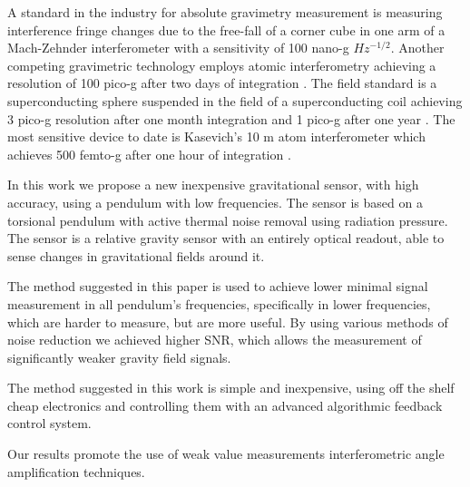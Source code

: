 \documentclass[\main/master.tex]{subfiles}
\begin{document}
\fi
\par\noindent
A standard in the industry for absolute gravimetry measurement is measuring interference fringe changes due to the free-fall of a corner cube in one arm of a Mach-Zehnder interferometer with a sensitivity of 100 nano-g $Hz^{-1/2}$. Another competing gravimetric technology employs atomic interferometry achieving a resolution of 100 pico-g after two days of integration \cite{Peters01}.
The field standard is a superconducting sphere suspended in the field of a superconducting coil achieving 3 pico-g resolution after one month integration and 1 pico-g  after one year \cite{Goodkind99}. 
The most sensitive device to date is Kasevich's 10 m atom interferometer which achieves 500 femto-g after one hour of integration \cite{PhysRevA.91.033629,kasevich2014prospects}. 
\par\noindent
In this work we propose a new inexpensive gravitational sensor, with high accuracy, using a pendulum with low frequencies. The sensor is based on a torsional pendulum with active thermal noise removal using radiation pressure. The sensor is a relative gravity sensor with an entirely optical readout, able to sense changes in gravitational fields around it. 
\iffalse
\fi
\par\noindent
The method suggested in this paper is used to achieve lower minimal signal measurement in all pendulum's frequencies, specifically in lower frequencies, which are harder to measure, but are more useful. By using various methods of noise reduction we achieved higher SNR, which allows the measurement of significantly weaker gravity field signals.
\par\noindent
The method suggested in this work is simple and inexpensive, using off the shelf cheap electronics and controlling them with an advanced algorithmic feedback control system.
\par\noindent
Our results promote the use of weak value measurements interferometric angle amplification techniques. 
\end{document}
